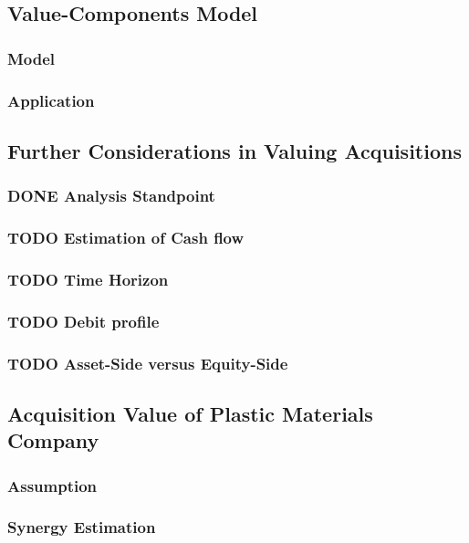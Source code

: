 \documentclass[11pt]{article}
\begin{document}
\subsection*{Value-Components Model}
\label{sec:orgca594a9}
\subsubsection*{Model}
\label{sec:org04c93f7}
\subsubsection*{Application}
\label{sec:orga3e0fe4}
\subsection*{Further Considerations in Valuing Acquisitions}
\label{sec:org987b802}
\subsubsection*{{\bfseries\sffamily DONE} Analysis Standpoint}
\label{sec:orgfe79708}
\subsubsection*{{\bfseries\sffamily TODO} Estimation of Cash flow}
\label{sec:org997b100}
\subsubsection*{{\bfseries\sffamily TODO} Time Horizon}
\label{sec:org2443501}
\subsubsection*{{\bfseries\sffamily TODO} Debit profile}
\label{sec:orgd24e6cd}
\subsubsection*{{\bfseries\sffamily TODO} Asset-Side versus Equity-Side}
\label{sec:org5af6987}
\subsection*{Acquisition Value of Plastic Materials Company}
\label{sec:orgb824bf4}
\subsubsection*{Assumption}
\label{sec:org426f5f2}
\subsubsection*{Synergy Estimation}
\label{sec:org83d4158}
\end{document}
